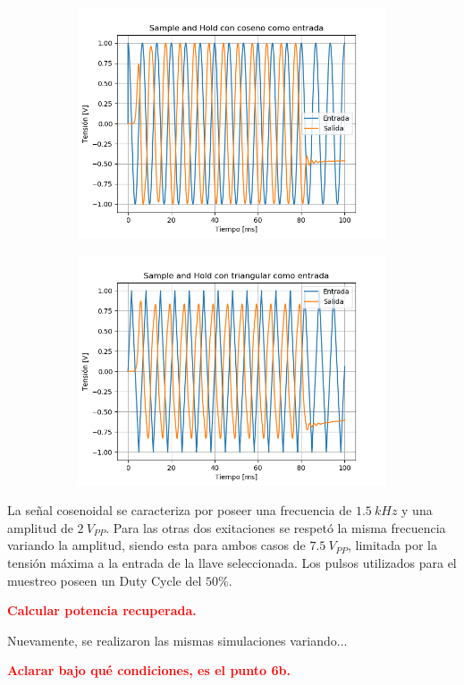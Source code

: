 \begin{figure}[H]
\centering
\begin{subfigure}{.49\textwidth}
	\centering
	\includegraphics[width=\textwidth]{ImagenesEjercicio6/SH - Cos.png}
\end{subfigure}
\begin{subfigure}{.49\textwidth}
	\centering
	\includegraphics[width=\textwidth]{ImagenesEjercicio6/SH - Tri.png}
\end{subfigure}
\end{figure} 

La señal cosenoidal se caracteriza por poseer una frecuencia de $1.5 \ kHz$ y una amplitud de $2 \ V_{PP}$. Para las otras dos exitaciones se respetó la misma frecuencia variando la amplitud, siendo esta para ambos casos de $7.5 \ V_{PP}$, limitada por la tensión máxima a la entrada de la llave seleccionada. Los pulsos utilizados para el muestreo poseen un Duty Cycle del $50 \%$.

\textcolor{red}{\textbf{Calcular potencia recuperada.}}

Nuevamente, se realizaron las mismas simulaciones variando...

\textcolor{red}{\textbf{Aclarar bajo qué condiciones, es el punto 6b.}}


